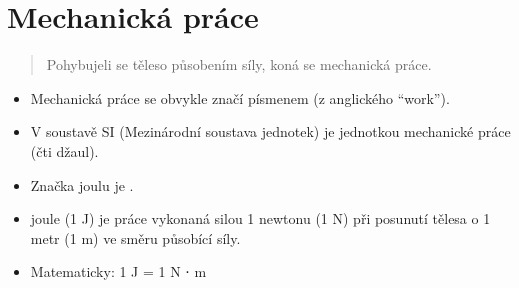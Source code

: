 \documentclass[letterpaper,10pt,english]{jupyterBook}
\begin{document}
\sphinxstepscope


\section{Mechanická práce}
\label{\detokenize{Prednasky/1_4_Energie:mechanicka-prace}}\label{\detokenize{Prednasky/1_4_Energie::doc}}\begin{quote}

\sphinxAtStartPar
Pohybuje\sphinxhyphen{}li se těleso působením síly, koná se mechanická práce.
\end{quote}

\sphinxAtStartPar
{}
\begin{itemize}
\item {} 
\sphinxAtStartPar
Mechanická práce se obvykle značí písmenem  (z anglického “work”).

\end{itemize}

\sphinxAtStartPar
{}
\begin{itemize}
\item {} 
\sphinxAtStartPar
V soustavě SI (Mezinárodní soustava jednotek) je jednotkou mechanické práce  (čti džaul).

\item {} 
\sphinxAtStartPar
Značka joulu je .

\end{itemize}

\sphinxAtStartPar
{}
\begin{itemize}
\item {} 
 joule (1 J) je práce vykonaná silou 1 newtonu (1 N) při posunutí tělesa o 1 metr (1 m) ve směru působící síly.

\item {} 
\sphinxAtStartPar
Matematicky: 1 J = 1 N ⋅ m

\end{itemize}
\end{document}
